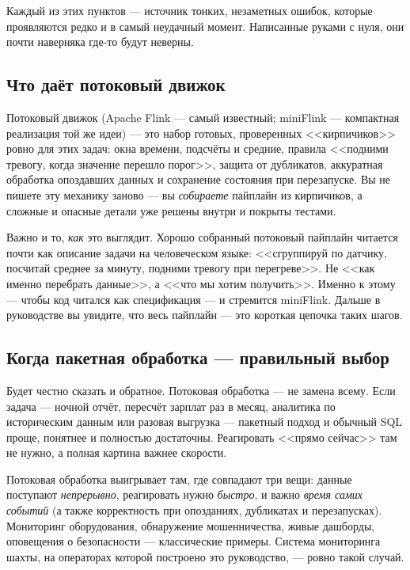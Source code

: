 \documentclass[11pt,a4paper]{article}
\begin{document}
Каждый из этих пунктов --- источник тонких, незаметных ошибок, которые
проявляются редко и в самый неудачный момент. Написанные руками с нуля,
они почти наверняка где-то будут неверны.

\subsection{Что даёт потоковый движок}

Потоковый движок (Apache Flink --- самый известный; miniFlink ---
компактная реализация той же идеи) --- это набор готовых, проверенных
<<кирпичиков>> ровно для этих задач: окна времени, подсчёты и средние,
правила <<подними тревогу, когда значение перешло порог>>, защита от
дубликатов, аккуратная обработка опоздавших данных и сохранение
состояния при перезапуске. Вы не пишете эту механику заново --- вы
\emph{собираете} пайплайн из кирпичиков, а сложные и опасные детали уже
решены внутри и покрыты тестами.

Важно и то, \emph{как} это выглядит. Хорошо собранный потоковый
пайплайн читается почти как описание задачи на человеческом языке:
<<сгруппируй по датчику, посчитай среднее за минуту, подними тревогу при
перегреве>>. Не <<как именно перебрать данные>>, а <<что мы хотим
получить>>. Именно к этому --- чтобы код читался как спецификация ---
и стремится miniFlink. Дальше в руководстве вы увидите, что весь
пайплайн --- это короткая цепочка таких шагов.

\subsection{Когда пакетная обработка --- правильный выбор}

Будет честно сказать и обратное. Потоковая обработка --- не замена
всему. Если задача --- ночной отчёт, пересчёт зарплат раз в месяц,
аналитика по историческим данным или разовая выгрузка --- пакетный
подход и обычный SQL проще, понятнее и полностью достаточны. Реагировать
<<прямо сейчас>> там не нужно, а полная картина важнее скорости.

Потоковая обработка выигрывает там, где совпадают три вещи: данные
поступают \emph{непрерывно}, реагировать нужно \emph{быстро}, и важно
\emph{время самих событий} (а также корректность при опозданиях,
дубликатах и перезапусках). Мониторинг оборудования, обнаружение
мошенничества, живые дашборды, оповещения о безопасности --- классические
примеры. Система мониторинга шахты, на операторах которой построено это
руководство, --- ровно такой случай.
\end{document}
